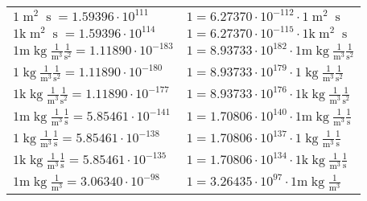 \begin{center}
\begin{longtable}{l l}
{\color{black}$1 \bm{\mathrm{ }}{\operatorname{m}^2}{\operatorname{s}}{}{} = 1.59396\cdot10^{111} $}   & {\color{black}$ 1 = 6.27370\cdot10^{-112} \cdot 1 \bm{\mathrm{ }}{\operatorname{m}^2}{\operatorname{s}}{}{}$}  \\
{\color{gray}$1 \bm{\mathrm{ k}}{\operatorname{m}^2}{\operatorname{s}}{}{} = 1.59396\cdot10^{114} $}   & {\color{gray}$ 1 = 6.27370\cdot10^{-115} \cdot 1 \bm{\mathrm{ k}}{\operatorname{m}^2}{\operatorname{s}}{}{}$}  \\
\hline{\color{gray}$1 \bm{\mathrm{ m}}\operatorname{kg}\frac1{\operatorname{m}^3}\frac1{\operatorname{s}^2}{}{} = 1.11890\cdot10^{-183} $}   & {\color{gray}$ 1 = 8.93733\cdot10^{182} \cdot 1 \bm{\mathrm{ m}}\operatorname{kg}\frac1{\operatorname{m}^3}\frac1{\operatorname{s}^2}{}{}$}  \\
{\color{black}$1 \bm{\mathrm{ }}\operatorname{kg}\frac1{\operatorname{m}^3}\frac1{\operatorname{s}^2}{}{} = 1.11890\cdot10^{-180} $}   & {\color{black}$ 1 = 8.93733\cdot10^{179} \cdot 1 \bm{\mathrm{ }}\operatorname{kg}\frac1{\operatorname{m}^3}\frac1{\operatorname{s}^2}{}{}$}  \\
{\color{gray}$1 \bm{\mathrm{ k}}\operatorname{kg}\frac1{\operatorname{m}^3}\frac1{\operatorname{s}^2}{}{} = 1.11890\cdot10^{-177} $}   & {\color{gray}$ 1 = 8.93733\cdot10^{176} \cdot 1 \bm{\mathrm{ k}}\operatorname{kg}\frac1{\operatorname{m}^3}\frac1{\operatorname{s}^2}{}{}$}  \\
{\color{gray}$1 \bm{\mathrm{ m}}\operatorname{kg}\frac1{\operatorname{m}^3}\frac1{\operatorname{s}}{}{} = 5.85461\cdot10^{-141} $}   & {\color{gray}$ 1 = 1.70806\cdot10^{140} \cdot 1 \bm{\mathrm{ m}}\operatorname{kg}\frac1{\operatorname{m}^3}\frac1{\operatorname{s}}{}{}$}  \\
{\color{black}$1 \bm{\mathrm{ }}\operatorname{kg}\frac1{\operatorname{m}^3}\frac1{\operatorname{s}}{}{} = 5.85461\cdot10^{-138} $}   & {\color{black}$ 1 = 1.70806\cdot10^{137} \cdot 1 \bm{\mathrm{ }}\operatorname{kg}\frac1{\operatorname{m}^3}\frac1{\operatorname{s}}{}{}$}  \\
{\color{gray}$1 \bm{\mathrm{ k}}\operatorname{kg}\frac1{\operatorname{m}^3}\frac1{\operatorname{s}}{}{} = 5.85461\cdot10^{-135} $}   & {\color{gray}$ 1 = 1.70806\cdot10^{134} \cdot 1 \bm{\mathrm{ k}}\operatorname{kg}\frac1{\operatorname{m}^3}\frac1{\operatorname{s}}{}{}$}  \\
{\color{gray}$1 \bm{\mathrm{ m}}\operatorname{kg}\frac1{\operatorname{m}^3}{}{}{} = 3.06340\cdot10^{-98} $}   & {\color{gray}$ 1 = 3.26435\cdot10^{97} \cdot 1 \bm{\mathrm{ m}}\operatorname{kg}\frac1{\operatorname{m}^3}{}{}{}$}  \\

\end{longtable}
\end{center}
